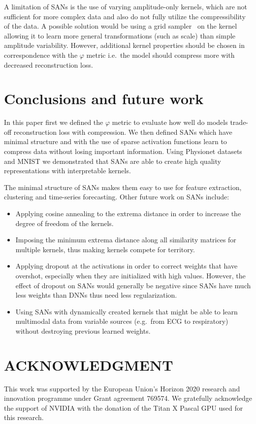 \documentclass[journal]{IEEEtran}
\begin{document}
A limitation of SANs is the use of varying amplitude-only kernels, which are not sufficient for more complex data and also do not fully utilize the compressibility of the data.
A possible solution would be using a grid sampler~\cite{jaderberg2015spatial} on the kernel allowing it to learn more general transformations (such as scale) than simple amplitude variability.
However, additional kernel properties should be chosen in correspondence with the $\varphi$ metric i.e.\ the model should compress more with decreased reconstruction loss.

\section{Conclusions and future work}\label{sec:conclusions}
In this paper first we defined the $\varphi$ metric to evaluate how well do models trade-off reconstruction loss with compression.
We then defined SANs which have minimal structure and with the use of sparse activation functions learn to compress data without losing important information.
Using Physionet datasets and MNIST we demonstrated that SANs are able to create high quality representations with interpretable kernels.

The minimal structure of SANs makes them easy to use for feature extraction, clustering and time-series forecasting.
Other future work on SANs include:
\begin{itemize}
	\item Applying cosine annealing to the extrema distance in order to increase the degree of freedom of the kernels.
	\item Imposing the minimum extrema distance along all similarity matrices for multiple kernels, thus making kernels compete for territory.
	\item Applying dropout at the activations in order to correct weights that have overshot, especially when they are initialized with high values.
		However, the effect of dropout on SANs would generally be negative since SANs have much less weights than DNNs thus need less regularization.
	\item Using SANs with dynamically created kernels that might be able to learn multimodal data from variable sources (e.g.\ from ECG to respiratory) without destroying previous learned weights.
\end{itemize}

\section*{ACKNOWLEDGMENT}
This work was supported by the European Union's Horizon 2020 research and innovation programme under Grant agreement 769574.
We gratefully acknowledge the support of NVIDIA with the donation of the Titan X Pascal GPU used for this research.



\end{document}
